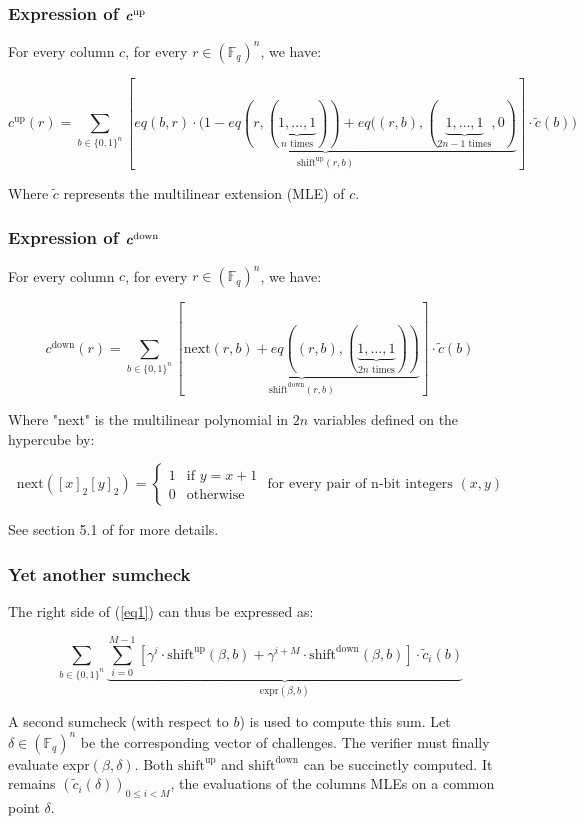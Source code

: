 \documentclass{article}
\newcommand{\Fq}{\mathbb F_q}
\begin{document}
\subsubsection{\texorpdfstring{Expression of $\textbf{\textit{c}}^{\text{up}}$}{}}

For every column $c$, for every $r \in (\Fq)^n$, we have:

$$c^{\text{up}}(r) = \sum_{b \in \{0, 1\}^n} [\underbrace{eq(b, r) \cdot (1 - eq(r, (\underbrace{1, \dots, 1}_{n \text{ times}})) + eq((r, b), (\underbrace{1, \dots, 1}_{2n - 1 \text{ times}}, 0)}_{\text{shift}^{\text{up}}(r, b)}] \cdot \tilde{c}(b)) $$

Where $\tilde{c}$ represents the multilinear extension (MLE) of $c$.

\subsubsection{\texorpdfstring{Expression of $\textbf{\textit{c}}^{\text{down}}$}{}}

For every column $c$, for every $r \in (\Fq)^n$, we have:

$$c^{\text{down}}(r) = \sum_{b \in \{0, 1\}^n} [\underbrace{\text{next}(r, b) +  eq((r, b), (\underbrace{1, \dots, 1}_{2n \text{ times}}))}_{\text{shift}^{\text{down}}(r, b)}] \cdot \tilde{c}(b) $$

Where "next" is the multilinear polynomial in $2n$ variables defined on the hypercube by: 

$$\text{next}([x]_2 [y]_2)  = \begin{cases}
			1 & \text{if } y = x +1\\
            0 & \text{otherwise}
		 \end{cases} \text{ for every pair of n-bit integers } (x, y)$$

See section 5.1 of \cite{ccs} for more details.

\subsubsection{Yet another sumcheck}

The right side of (\ref{eq1}) can thus be expressed as:

$$\sum_{b \in \{0, 1\}^n} \underbrace{\sum_{i = 0}^{M-1} [\gamma^i \cdot \text{shift}^{\text{up}}(\beta, b) + \gamma^{i+M} \cdot \text{shift}^{\text{down}}(\beta, b) ] \cdot \tilde{c}_i(b)}_{\text{expr}(\beta, b)}$$

A second sumcheck (with respect to $b$) is used to compute this sum. Let $\delta \in (\Fq)^n$ be the corresponding vector of challenges. The verifier must finally evaluate $\text{expr}(\beta, \delta)$. Both $\text{shift}^{\text{up}}$ and $\text{shift}^{\text{down}}$ can be succinctly computed. It remains $(\tilde{c}_i(\delta))_{0 \leq i < M}$, the evaluations of the columns MLEs on a common point $\delta$.
\end{document}
